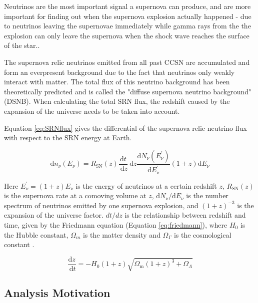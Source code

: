 Neutrinos are the most important signal a supernova can produce, and are more important for finding out when the supernova explosion actually happened - due to neutrinos leaving the supernovae immediately while gamma rays from the the explosion can only leave the supernova when the shock wave reaches the surface of the star.\cite{bethe_supernova_1990}.

The supernova relic neutrinos emitted from all past CCSN are accumulated and form an everpresent background due to the fact that neutrinos only weakly interact with matter. The total flux of this neutrino background has been theoretically predicted and is called the "diffuse supernova neutrino background" (DSNB). When calculating the total SRN flux, the redshift caused by the expansion of the universe needs to be taken into account.

Equation \ref{eq:SRNflux} gives the differential of the supernova relic neutrino flux with respect to the SRN energy at Earth.

\begin{equation}
\mathrm{d} n_{\nu}\left(E_{\nu}\right)=R_{\mathrm{SN}}(z) \frac{\mathrm{d} t}{\mathrm{~d} z} \mathrm{~d} z \frac{\mathrm{d} N_{\nu}\left(E_{\nu}^{\prime}\right)}{\mathrm{d} E_{\nu}^{\prime}}(1+z) \mathrm{d} E_{\nu}
\label{eq:SRNflux}
\end{equation}

Here $E_{\nu}^{\prime}=(1+z) E_{\nu}$ is the energy of neutrinos at a certain redshift $z$, $R_{\mathrm{SN}}(z)$ is the supernova rate at a comoving volume at $z$, $\mathrm{d} N_{\nu} / \mathrm{d} E_{\nu}$ is the number spectrum of neutrinos emitted by one supernova explosion, and $(1+z)^{-3}$ is the expansion of the universe factor. $dt/dz$ is the relationship between redshift and time, given by the Friedmann equation (Equation \ref{eq:friedmann}), where $H_{0}$ is the Hubble constant, $\Omega_{m}$ is the matter density and $\Omega_{\Gamma}$ is the cosmological constant \cite{ando_relic_2004}.

\begin{equation}
\frac{\mathrm{d} z}{\mathrm{~d} t}=-H_{0}(1+z) \sqrt{\Omega_{\mathrm{m}}(1+z)^{3}+\Omega_{\Lambda}}
\label{eq:friedmann}
\end{equation}



\subsection{Analysis Motivation}


